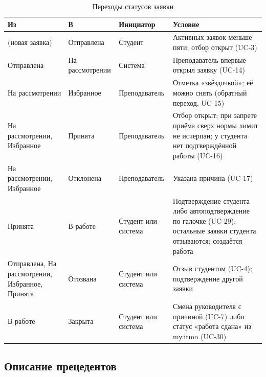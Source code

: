 \documentclass[a4paper,12pt]{article}
\begin{document}
\begin{table}[H]
\centering
\small
\begin{tabular}{|p{3.4cm}|p{2.3cm}|p{3.0cm}|p{5.6cm}|}
\hline
\textbf{Из} & \textbf{В} & \textbf{Инициатор} & \textbf{Условие}\\ \hline
(новая заявка) & Отправлена & Студент & Активных заявок меньше пяти; отбор открыт (UC-3)\\ \hline
Отправлена & На рассмотрении & Система & Преподаватель впервые открыл заявку (UC-14)\\ \hline
На рассмотрении & Избранное & Преподаватель & Отметка «звёздочкой»; её можно снять (обратный переход, UC-15)\\ \hline
На рассмотрении, Избранное & Принята & Преподаватель & Отбор открыт; при запрете приёма сверх нормы лимит не исчерпан; у студента нет подтверждённой работы (UC-16)\\ \hline
На рассмотрении, Избранное & Отклонена & Преподаватель & Указана причина (UC-17)\\ \hline
Принята & В работе & Студент или система & Подтверждение студента либо автоподтверждение по галочке (UC-29); остальные заявки студента отзываются; создаётся работа\\ \hline
Отправлена, На рассмотрении, Избранное, Принята & Отозвана & Студент или система & Отзыв студентом (UC-4); подтверждение другой заявки\\ \hline
В работе & Закрыта & Студент или система & Смена руководителя с причиной (UC-7) либо статус «работа сдана» из my.itmo (UC-30)\\ \hline
\end{tabular}
\caption{Переходы статусов заявки}\label{tab:status}
\end{table}

\subsection{Описание прецедентов}\label{sec:ucd}
\end{document}
